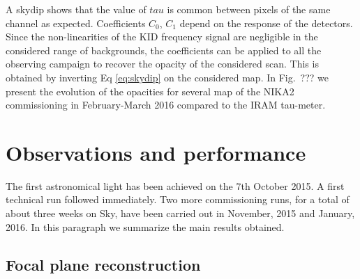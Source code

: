 \documentclass[]{aa} %
\begin{document}
A skydip shows that the value of $tau$ is common between pixels of the same channel as expected. Coefficients  $C_0$, $C_1$ depend on the response of the detectors. Since the non-linearities of the KID frequency signal are negligible in the considered range of backgrounds, the coefficients can be applied to all the observing campaign to recover the opacity of the considered scan. This is
obtained by inverting Eq \ref{eq:skydip} on the considered map. In Fig.~??? we present the evolution of the opacities for several map of the NIKA2 commissioning  in February-March 2016 compared to the IRAM tau-meter.


\section{Observations and performance}

The first astronomical light has been achieved on the 7th October 2015. A first technical run followed immediately. Two more commissioning runs, for a total of about three weeks on Sky, have been carried out in November, 2015 and January, 2016. In this paragraph we summarize the main results obtained.

\subsection{Focal plane reconstruction}
\end{document}

